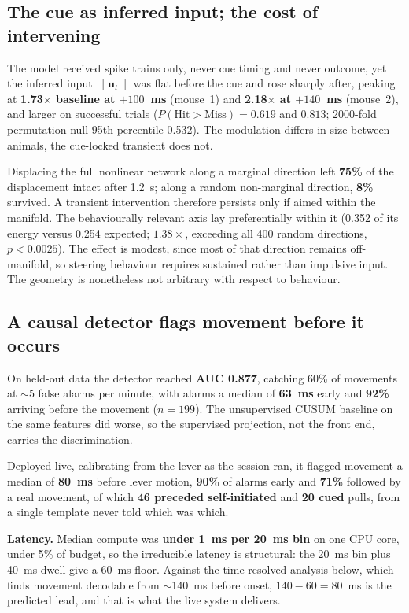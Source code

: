 \documentclass[10pt,twocolumn]{article}
\begin{document}
\subsection{The cue as inferred input; the cost of intervening}

The model received spike trains only, never cue timing and never outcome, yet
the inferred input $\|\mathbf{u}_t\|$ was flat before the cue and rose sharply
after, peaking at \textbf{1.73$\times$ baseline at $+100$~ms} (mouse~1) and
\textbf{2.18$\times$ at $+140$~ms} (mouse~2), and larger on successful trials
($P(\text{Hit}>\text{Miss})=0.619$ and $0.813$; 2000-fold permutation null 95th
percentile 0.532). The modulation differs in size between animals, the
cue-locked transient does not.

Displacing the full nonlinear network along a marginal direction left
\textbf{75\%} of the displacement intact after 1.2~s; along a random
non-marginal direction, \textbf{8\%} survived. A transient intervention
therefore persists only if aimed within the manifold. The behaviourally relevant
axis lay preferentially within it (0.352 of its energy versus 0.254 expected;
$1.38\times$, exceeding all 400 random directions, $p<0.0025$). The effect is modest, since most of that direction remains off-manifold, so steering behaviour requires sustained rather than impulsive input. The geometry is nonetheless not arbitrary with respect to behaviour.

\subsection{A causal detector flags movement before it occurs}

On held-out data the detector reached \textbf{AUC 0.877}, catching 60\% of
movements at $\sim$5 false alarms per minute, with alarms a median of
\textbf{63~ms} early and \textbf{92\%} arriving before the movement ($n=199$).
The unsupervised CUSUM baseline on the same features did worse, so the
supervised projection, not the front end, carries the discrimination.

Deployed live, calibrating from the lever as the session ran, it flagged
movement a median of \textbf{80~ms} before lever motion, \textbf{90\%} of alarms
early and \textbf{71\%} followed by a real movement, of which \textbf{46
preceded self-initiated} and \textbf{20 cued} pulls, from a single template never
told which was which.

\textbf{Latency.} Median compute was \textbf{under 1~ms per 20~ms bin} on one
CPU core, under 5\% of budget, so the irreducible latency is structural: the
20~ms bin plus 40~ms dwell give a 60~ms floor. Against the time-resolved
analysis below, which finds movement decodable from $\sim$140~ms before onset,
$140-60=80$~ms is the predicted lead, and that is what the live system delivers.
\end{document}
